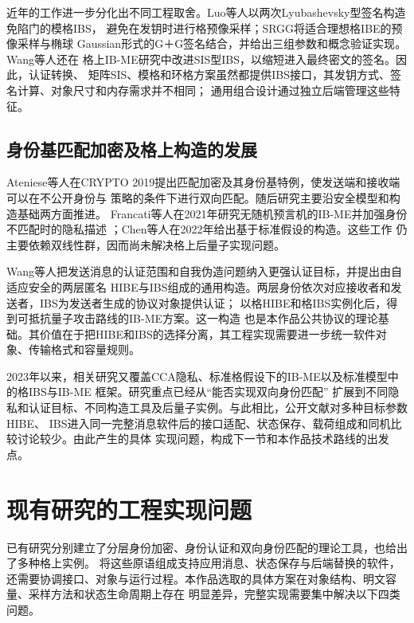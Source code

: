 近年的工作进一步分化出不同工程取舍。Luo等人以两次Lyubashevsky型签名构造免陷门的模格IBS，
避免在发钥时进行格预像采样\cite{luo2024ibs}；SRGG将适合理想格IBE的预像采样与椭球
Gaussian形式的G＋G签名结合，并给出三组参数和概念验证实现\cite{jia2025ibs}。Wang等人还在
格上IB-ME研究中改进SIS型IBS，以缩短进入最终密文的签名\cite{wang2024ibme}。因此，认证转换、
矩阵SIS、模格和环格方案虽然都提供IBS接口，其发钥方式、签名计算、对象尺寸和内存需求并不相同；
通用组合设计通过独立后端管理这些特征。

\subsection{身份基匹配加密及格上构造的发展}

Ateniese等人在CRYPTO 2019提出匹配加密及其身份基特例，使发送端和接收端可以在不公开身份与
策略的条件下进行双向匹配\cite{ateniese2019me}。随后研究主要沿安全模型和构造基础两方面推进。
Francati等人在2021年研究无随机预言机的IB-ME并加强身份不匹配时的隐私描述
\cite{francati2021ibme}；Chen等人在2022年给出基于标准假设的构造\cite{chen2022ibme}。这些工作
仍主要依赖双线性群，因而尚未解决格上后量子实现问题。

Wang等人把发送消息的认证范围和自我伪造问题纳入更强认证目标，并提出由自适应安全的两层匿名
HIBE与IBS组成的通用构造。两层身份依次对应接收者和发送者，IBS为发送者生成的协议对象提供认证；
以格HIBE和格IBS实例化后，得到可抵抗量子攻击路线的IB-ME方案\cite{wang2024ibme}。这一构造
也是本作品公共协议的理论基础。其价值在于把HIBE和IBS的选择分离，其工程实现需要进一步统一软件对象、传输格式和容量规则。

2023年以来，相关研究又覆盖CCA隐私、标准格假设下的IB-ME以及标准模型中的格IBS与IB-ME
框架\cite{chiku2023ibme,belfiore2024ibme,yu2026ibme}。研究重点已经从“能否实现双向身份匹配”
扩展到不同隐私和认证目标、不同构造工具及后量子实例。与此相比，公开文献对多种目标参数HIBE、
IBS进入同一完整消息软件后的接口适配、状态保存、载荷组成和同机比较讨论较少。由此产生的具体
实现问题，构成下一节和本作品技术路线的出发点。

\section{现有研究的工程实现问题}

已有研究分别建立了分层身份加密、身份认证和双向身份匹配的理论工具，也给出了多种格上实例。
将这些原语组成支持应用消息、状态保存与后端替换的软件，还需要协调接口、对象与运行过程。本作品选取的具体方案在对象结构、明文容量、采样方法和状态生命周期上存在
明显差异，完整实现需要集中解决以下四类问题。


